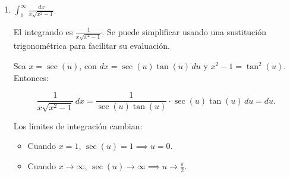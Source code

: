 \documentclass{article}
\begin{document}
\begin{enumerate}
\begin{enumerate}
Comportamiento de \( \log(\tan(x)) \) cuando \( x \to \frac{\pi}{2}^- \):
Cuando \( x \to \frac{\pi}{2}^- \), \( \tan(x) \to \infty \), lo que hace que \( \log(\tan(x)) \to \infty \). Esto sugiere que se necesita investigar más de cerca el comportamiento de la función en este límite.

Para esto, se puede hacer un cambio de variable adecuado para analizar el comportamiento cerca de \( x = \frac{\pi}{2} \). Considerando el cambio de variable \( x = \frac{\pi}{2} - u \), donde \( u \to 0^+ \) cuando \( x \to \frac{\pi}{2} \), entonces:
\[
\tan\left(\frac{\pi}{2} - u\right) = \cot(u),
\]
y para valores pequeños de \( u \), se tiene que \( \cot(u) \approx \frac{1}{u} \). Por lo tanto, cerca de \( x = \frac{\pi}{2} \), la función \( \log(\tan(x)) \) se comporta aproximadamente como
\[
\log\left(\frac{1}{u}\right) = -\log(u).
\]
Entonces, cerca de \( x = \frac{\pi}{2} \),
\[
\log(\tan(x)) \approx -\log(u).
\]
Esto implica que la integral en el límite \( x \to \frac{\pi}{2} \) se comporta como
\[
\int_0^\epsilon -\log(u) \, du.
\]
La integral de \( -\log(u) \) en el intervalo \( [0, \epsilon] \) es conocida y es convergente:
\[
\int_0^\epsilon -\log(u) \, du = -\epsilon \log(\epsilon) + \epsilon.
\]
Este término es finito cuando \( \epsilon \to 0 \).

Dado que tanto el comportamiento cerca de \( x = 0 \) como cerca de \( x = \frac{\pi}{2} \) no presentan problemas de divergencia, se concluye que la integral es convergente.
      
		\item $ \int_{1}^{\infty} \frac{dx}{x\sqrt{x^2-1}} $
\[\]       

El integrando es \( \frac{1}{x\sqrt{x^2 - 1}} \). Se puede simplificar usando una sustitución trigonométrica para facilitar su evaluación.

Sea \( x = \sec(u) \), con \( dx = \sec(u)\tan(u) \, du \) y \( x^2 - 1 = \tan^2(u) \). Entonces:

\[
\frac{1}{x\sqrt{x^2 - 1}} \, dx = \frac{1}{\sec(u)\tan(u)} \cdot \sec(u)\tan(u) \, du = du.
\]

Los límites de integración cambian:

\begin{itemize}
    \item Cuando \( x = 1 \), \( \sec(u) = 1 \implies u = 0 \).
    \item Cuando \( x \to \infty \), \( \sec(u) \to \infty \implies u \to \frac{\pi}{2} \).
\end{itemize}


\end{enumerate}
\end{enumerate}
\end{document}
